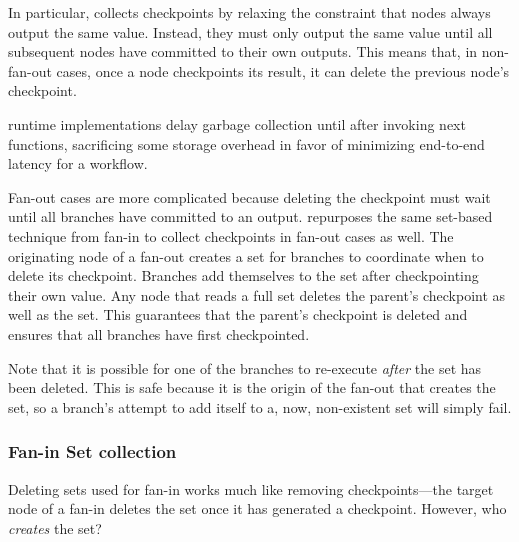 In particular, \name{} collects checkpoints by relaxing the constraint that
nodes always output the same value. Instead, they must only output the same
value until all subsequent nodes have committed to their own outputs. This
means that, in non-fan-out cases, once a node checkpoints its result, it can
delete the previous node's checkpoint.

\name{} runtime implementations delay garbage collection until after invoking
next functions, sacrificing some storage overhead in favor of minimizing
end-to-end latency for a workflow.

Fan-out cases are more complicated because deleting the checkpoint must wait
until all branches have committed to an output. \name{} repurposes the same
set-based technique from fan-in to collect checkpoints in fan-out cases as well.
The originating node of a fan-out creates a set for branches to coordinate when
to delete its checkpoint. Branches add themselves to the set after checkpointing
their own value. Any node that reads a full set deletes the parent's checkpoint
as well as the set. This guarantees that the parent's checkpoint is deleted and
ensures that all branches have first checkpointed.

Note that it is possible for one of the branches to re-execute \emph{after} the
set has been deleted. This is safe because it is the origin of the fan-out that
creates the set, so a branch's attempt to add itself to a, now, non-existent set
will simply fail.



\subsubsection{Fan-in Set collection}

Deleting sets used for fan-in works much like removing checkpoints---the target
node of a fan-in deletes the set once it has generated a checkpoint. However,
who \emph{creates} the set?

